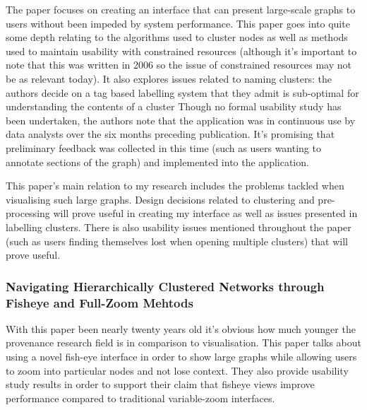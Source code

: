 The paper focuses on creating an interface that can present large-scale graphs to users without been impeded by system performance. This paper goes into quite some depth relating to the algorithms used to cluster nodes as well as methods used to maintain usability with constrained resources (although it's important to note that this was written in 2006 so the issue of constrained resources may not be as relevant today). It also explores issues related to naming clusters: the authors decide on a tag based labelling system that they admit is sub-optimal for understanding the contents of a cluster Though no formal usability study has been undertaken, the authors note that the application was in continuous use by data analysts over the six months preceding publication. It's promising that preliminary feedback was collected in this time (such as users wanting to annotate sections of the graph) and implemented into the application.

This paper's main relation to my research includes the problems tackled when visualising such large graphs. Design decisions related to clustering and pre-processing will prove useful in creating my interface as well as issues presented in labelling clusters. There is also usability issues mentioned throughout the paper (such as users finding themselves lost when opening multiple clusters) that will prove useful.

\subsubsection{Navigating Hierarchically Clustered Networks through Fisheye and Full-Zoom Mehtods\cite{Schaffer1996}}
\label{sub:navigating_hierarchically_clustered_networks_through_fisheye_and_full_zoom_mehtodsschaffer1996}

With this paper been nearly twenty years old it's obvious how much younger the provenance research field is in comparison to visualisation. This paper talks about using a novel fish-eye interface in order to show large graphs while allowing users to zoom into particular nodes and not lose context. They also provide usability study results in order to support their claim that fisheye views improve performance compared to traditional variable-zoom interfaces.

